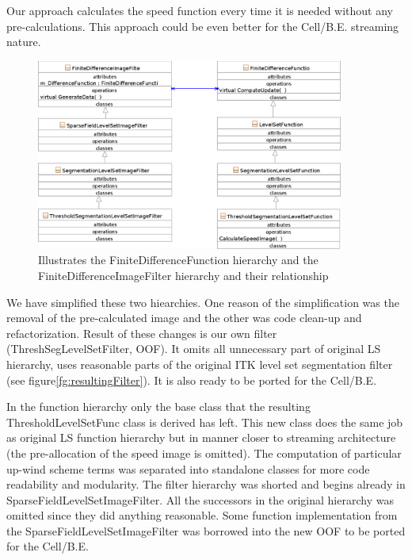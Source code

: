 \par
Our approach calculates the speed function every time it is needed without any pre-calculations.
This approach could be even better for the Cell/B.E. streaming nature.

\begin{figure}
    \centering
    \includegraphics[width=0.9\textwidth]{data/originalHierarchy}
    \caption[Original ITK thresholding level set filter class hierarchy]
{Illustrates the FiniteDifferenceFunction hierarchy and the FiniteDifferenceImageFilter hierarchy and their relationship}
    \label{fg:originalHierarchy}
\end{figure}

\par
We have simplified these two hiearchies.
One reason of the simplification was the removal of the pre-calculated image and the other was code clean-up and refactorization.
Result of these changes is our own filter (ThreshSegLevelSetFilter, OOF).
It omits all unnecessary part of original LS hierarchy, uses reasonable parts of the original ITK level set segmentation filter (see figure\ref{fg:resultingFilter}).
It is also ready to be ported for the Cell/B.E.

\par
In the function hierarchy only the base class that the resulting ThresholdLevelSetFunc class is derived has left.
This new class does the same job as original LS function hierarchy but in manner closer to streaming architecture (the pre-allocation of the speed image is omitted).
The computation of particular up-wind scheme terms was separated into standalone classes for more code readability and modularity.
The filter hierarchy was shorted and begins already in SparseFieldLevelSetImageFilter.
All the successors in the original hierarchy was omitted since they did anything reasonable.
Some function implementation from the SparseFieldLevelSetImageFilter was borrowed into the new OOF to be ported for the Cell/B.E.

